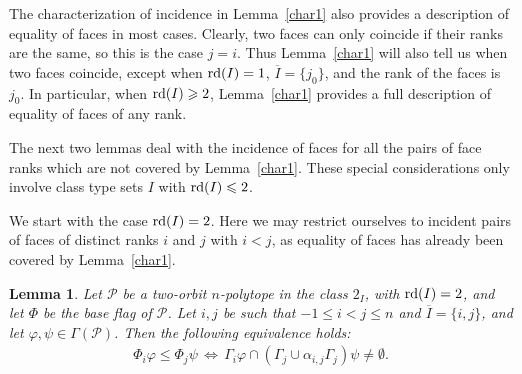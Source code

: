 \documentclass[12pt]{article}
\renewcommand{\phi}{\varphi}
\renewcommand{\bar}{\overline}
\renewcommand{\>}{\rangle}
\renewcommand{\leq}{\leqslant}
\renewcommand{\geq}{\geqslant}
\newtheorem{lemma}[theorem]{Lemma}
\theoremstyle{definition}\newtheorem{definition}{Definition}[section]
\begin{document}
The characterization of incidence in Lemma~\ref{char1} also provides a description of equality of faces in most cases. Clearly, two faces can only coincide if their ranks are the same, so this is the case $j=i$.  Thus Lemma~\ref{char1} will also tell us when two faces coincide, except when ${\rm rd}(I)=1$, $\bar{I}=\{j_0\}$, and the rank of the faces is $j_0$. In particular, when ${\rm rd}(I)\geq 2$, Lemma~\ref{char1} provides a full description of equality of faces of any rank.
\medskip

The next two lemmas deal with the incidence of faces for all the pairs of face ranks which are not covered by Lemma~\ref{char1}. These special considerations only involve class type sets $I$ with ${\rm rd}(I)\leq 2$. 
\smallskip

We start with the case ${\rm rd}(I)=2$. Here we may restrict ourselves to incident pairs of faces of distinct ranks $i$ and $j$ with $i<j$, as equality of faces has already been  covered by Lemma~\ref{char1}. 
\smallskip

\begin{lemma}
\label{char2}
Let $\mathcal{P}$ be a two-orbit $n$-polytope in the class $2_I$, with ${\rm rd}(I)=2$, and let $\Phi$ be the base flag of $\mathcal{P}$. Let $i,j$ be such that $-1 \leq i < j \leq n$ and $\bar{I}=\{i,j\}$, and let $\phi, \psi \in \Gamma(\mathcal{P})$.  Then the following equivalence holds: 
\begin{eqnarray}
\label{equivalence_n-2}
\Phi_i\phi \leq \Phi_j\psi\,\Longleftrightarrow\,\Gamma_i\phi \cap (\Gamma_j \cup \alpha_{i,j}\Gamma_j ) \psi \neq \emptyset.
\end{eqnarray}
\end{lemma}
\end{document}
